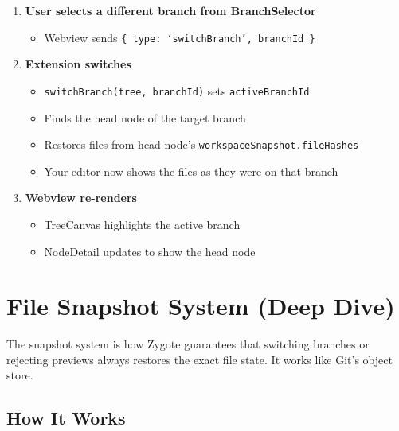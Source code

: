 \documentclass[12pt, a4paper]{article}
\begin{document}
\begin{enumerate}[label=\textbf{Step \arabic*:}, leftmargin=3cm]
    \item \textbf{User selects a different branch from BranchSelector}
    \begin{itemize}
        \item Webview sends \texttt{\{ type: `switchBranch', branchId \}}
    \end{itemize}

    \item \textbf{Extension switches}
    \begin{itemize}
        \item \texttt{switchBranch(tree, branchId)} sets \texttt{activeBranchId}
        \item Finds the head node of the target branch
        \item Restores files from head node's \texttt{workspaceSnapshot.fileHashes}
        \item Your editor now shows the files as they were on that branch
    \end{itemize}

    \item \textbf{Webview re-renders}
    \begin{itemize}
        \item TreeCanvas highlights the active branch
        \item NodeDetail updates to show the head node
    \end{itemize}
\end{enumerate}

\newpage

\section{File Snapshot System (Deep Dive)}

The snapshot system is how Zygote guarantees that switching branches or rejecting previews always restores the exact file state. It works like Git's object store.

\subsection{How It Works}
\end{document}
